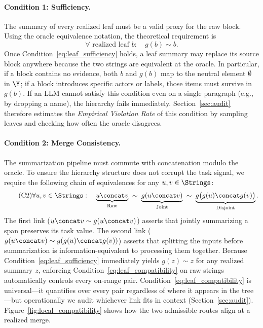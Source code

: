 \paragraph{Condition 1: Sufficiency.}
The summary of every realized leaf must be a valid proxy for the raw block. Using the oracle equivalence notation, the theoretical requirement is
\begin{equation}\tag{C1}\label{eq:leaf_sufficiency}
\forall \text{ realized leaf } b:\quad g(b)\sim b.
\end{equation}
Once Condition~\eqref{eq:leaf_sufficiency} holds, a leaf summary may replace its source block anywhere because the two strings are equivalent at the oracle. In particular, if a block contains no evidence, both $b$ and $g(b)$ map to the neutral element $\emptyset$ in $\Y$; if a block introduces specific actors or labels, those items must survive in $g(b)$. If an LLM cannot satisfy this condition even on a single paragraph (e.g., by dropping a name), the hierarchy fails immediately. Section~\ref{sec:audit} therefore estimates the \emph{Empirical Violation Rate} of this condition by sampling leaves and checking how often the oracle disagrees.

\paragraph{Condition 2: Merge Consistency.}
The summarization pipeline must commute with concatenation modulo the oracle. To ensure the hierarchy structure does not corrupt the task signal, we require the following chain of equivalences for any $u,v\in\Strings$:
\begin{equation}\tag{C2}\label{eq:leaf_compatibility}
\forall u,v\in\Strings:\quad
\underbrace{u\concat v}_{\text{Raw}} \;\sim\;
\underbrace{g(u\concat v)}_{\text{Joint}} \;\sim\;
\underbrace{g\big(g(u)\concat g(v)\big)}_{\text{Disjoint}}.
\end{equation}
The first link ($u\concat v \sim g(u\concat v)$) asserts that jointly summarizing a span preserves its task value. The second link ($g(u\concat v) \sim g(g(u)\concat g(v))$) asserts that splitting the inputs before summarization is information-equivalent to processing them together. Because Condition~\eqref{eq:leaf_sufficiency} immediately yields $g(z)\sim z$ for any realized summary $z$, enforcing Condition~\eqref{eq:leaf_compatibility} on raw strings automatically controls every on-range pair. Condition~\eqref{eq:leaf_compatibility} is universal---it quantifies over every pair regardless of where it appears in the tree—but operationally we audit whichever link fits in context (Section~\ref{sec:audit}). Figure~\ref{fig:local_compatibility} shows how the two admissible routes align at a realized merge.

